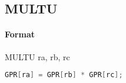\subsection{MULTU}


\paragraph{Format} MULTU ra, rb, rc

\begin{lstlisting}[language=C]
    GPR[ra] = GPR[rb] * GPR[rc];
\end{lstlisting}